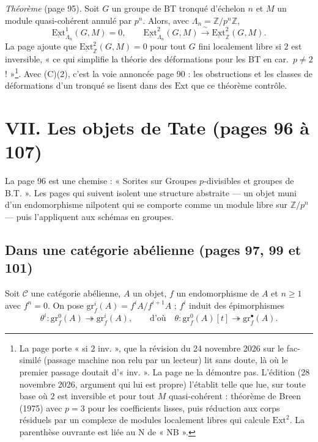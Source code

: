 \documentclass[11pt,a4paper]{article}
\begin{document}
\emph{Théorème} (page 95). Soit $G$ un groupe de BT tronqué d'échelon $n$
et $M$ un module quasi-cohérent annulé par $p^{n}$. Alors, avec
$\Lambda_n = \mathbb{Z}/p^{n}\mathbb{Z}$,
\[
\underline{\mathrm{Ext}}^{1}_{\Lambda_n}(G, M) = 0, \qquad
\underline{\mathrm{Ext}}^{2}_{\Lambda_n}(G, M) \xrightarrow{\ \sim\ }
\underline{\mathrm{Ext}}^{2}_{\mathbb{Z}}(G, M).
\]
La page ajoute que $\underline{\mathrm{Ext}}^{2}_{\mathbb{Z}}(G, M) = 0$
pour tout $G$ fini localement libre si $2$ est inversible, « ce qui
simplifie la théorie des déformations pour les BT en car.\ $p \neq 2$
! »\footnote{La page porte « si $2$ inv. », que la révision du 24 novembre 2026
sur le fac-similé (passage machine non relu par un lecteur) lit sans doute, là
où le premier passage doutait d'« inv. ». La page ne la démontre pas. L'édition
(28 novembre 2026, argument qui lui est propre) l'établit telle que lue, sur
toute base où $2$ est inversible et pour tout $M$ quasi-cohérent : théorème
de Breen (1975) avec $p = 3$ pour les coefficients lisses, puis réduction
aux corps résiduels par un complexe de modules localement libres qui
calcule $\mathrm{Ext}^2$. La parenthèse ouvrante est liée au N
de « NB ».}. Avec (C)(2), c'est la voie annoncée page 90 : les obstructions
et les classes de déformations d'un tronqué se lisent dans des
$\mathrm{Ext}$ que ce théorème contrôle.

\section*{VII. Les objets de Tate (pages 96 à 107)}

La page 96 est une chemise : « Sorites sur Groupes $p$-divisibles et
groupes de B.T. ». Les pages qui suivent isolent une structure abstraite
— un objet muni d'un endomorphisme nilpotent qui se comporte comme un
module libre sur $\mathbb{Z}/p^{n}$ — puis l'appliquent aux schémas en
groupes.

\subsection*{Dans une catégorie abélienne (pages 97, 99 et 101)}

Soit $\mathcal{C}$ une catégorie abélienne, $A$ un objet, $f$ un
endomorphisme de $A$ et $n \geq 1$ avec $f^{n} = 0$. On pose
$\mathrm{gr}^{i}_f(A) = f^{i}A / f^{i+1}A$ ; $f^{i}$ induit des
épimorphismes
\[
\theta^{i} \colon \mathrm{gr}^{0}_f(A) \twoheadrightarrow
\mathrm{gr}^{i}_f(A), \qquad \text{d'où}\quad
\theta \colon \mathrm{gr}^{0}_f(A)[t] \twoheadrightarrow
\mathrm{gr}^{\bullet}_f(A).
\]
\end{document}
